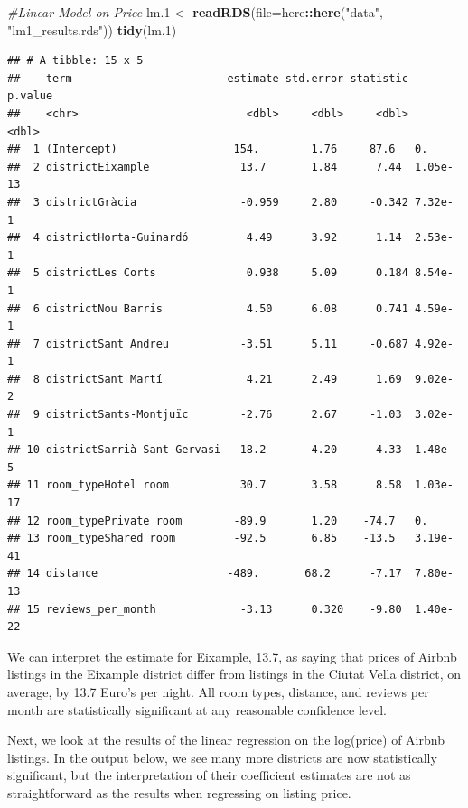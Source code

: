 \documentclass[]{article}
\newenvironment{Shaded}{\begin{snugshade}}{\end{snugshade}}
\newcommand{\CommentTok}[1]{\textcolor[rgb]{0.56,0.35,0.01}{\textit{#1}}}
\newcommand{\DataTypeTok}[1]{\textcolor[rgb]{0.13,0.29,0.53}{#1}}
\newcommand{\FloatTok}[1]{\textcolor[rgb]{0.00,0.00,0.81}{#1}}
\newcommand{\KeywordTok}[1]{\textcolor[rgb]{0.13,0.29,0.53}{\textbf{#1}}}
\newcommand{\NormalTok}[1]{#1}
\newcommand{\OperatorTok}[1]{\textcolor[rgb]{0.81,0.36,0.00}{\textbf{#1}}}
\newcommand{\StringTok}[1]{\textcolor[rgb]{0.31,0.60,0.02}{#1}}
\begin{document}
\begin{Shaded}
\begin{Highlighting}[]
\CommentTok{#Linear Model on Price}
\NormalTok{lm}\FloatTok{.1}\NormalTok{ <-}\StringTok{ }\KeywordTok{readRDS}\NormalTok{(}\DataTypeTok{file=}\NormalTok{here}\OperatorTok{::}\KeywordTok{here}\NormalTok{(}\StringTok{"data"}\NormalTok{, }\StringTok{"lm1_results.rds"}\NormalTok{))}
\KeywordTok{tidy}\NormalTok{(lm}\FloatTok{.1}\NormalTok{)}
\end{Highlighting}
\end{Shaded}

\begin{verbatim}
## # A tibble: 15 x 5
##    term                        estimate std.error statistic  p.value
##    <chr>                          <dbl>     <dbl>     <dbl>    <dbl>
##  1 (Intercept)                  154.        1.76     87.6   0.      
##  2 districtEixample              13.7       1.84      7.44  1.05e-13
##  3 districtGràcia                -0.959     2.80     -0.342 7.32e- 1
##  4 districtHorta-Guinardó         4.49      3.92      1.14  2.53e- 1
##  5 districtLes Corts              0.938     5.09      0.184 8.54e- 1
##  6 districtNou Barris             4.50      6.08      0.741 4.59e- 1
##  7 districtSant Andreu           -3.51      5.11     -0.687 4.92e- 1
##  8 districtSant Martí             4.21      2.49      1.69  9.02e- 2
##  9 districtSants-Montjuïc        -2.76      2.67     -1.03  3.02e- 1
## 10 districtSarrià-Sant Gervasi   18.2       4.20      4.33  1.48e- 5
## 11 room_typeHotel room           30.7       3.58      8.58  1.03e-17
## 12 room_typePrivate room        -89.9       1.20    -74.7   0.      
## 13 room_typeShared room         -92.5       6.85    -13.5   3.19e-41
## 14 distance                    -489.       68.2      -7.17  7.80e-13
## 15 reviews_per_month             -3.13      0.320    -9.80  1.40e-22
\end{verbatim}

We can interpret the estimate for Eixample, 13.7, as saying that prices
of Airbnb listings in the Eixample district differ from listings in the
Ciutat Vella district, on average, by 13.7 Euro's per night. All room
types, distance, and reviews per month are statistically significant at
any reasonable confidence level.

Next, we look at the results of the linear regression on the log(price)
of Airbnb listings. In the output below, we see many more districts are
now statistically significant, but the interpretation of their
coefficient estimates are not as straightforward as the results when
regressing on listing price.
\end{document}
